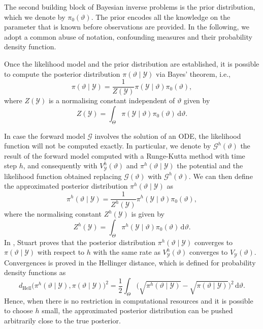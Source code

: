 \documentclass{siamart1116}
\numberwithin{theorem}{section}
\renewcommand{\theta}{\vartheta}
\newcommand{\Hell}{d_{\mathrm{Hell}}}
\newcommand{\dd}{\mathrm{d}}
\begin{document}
The second building block of Bayesian inverse problems is the prior distribution, which we denote by $\pi_0(\theta)$. The prior encodes all the knowledge on the parameter that is known before observations are provided. In the following, we adopt a common abuse of notation, confounding measures and their probability density function. 

Once the likelihood model and the prior distribution are established, it is possible to compute the posterior distribution $\pi(\theta \mid \mathcal{Y})$ via Bayes' theorem, i.e.,
\begin{equation}
	\pi(\theta\mid\mathcal{Y}) = \frac{1}{Z(\mathcal{Y})} \pi(\mathcal{Y}\mid \theta) \pi_0(\theta),
\end{equation}
where $Z(\mathcal{Y})$ is a normalising constant independent of $\theta$ given by
\begin{equation}
	Z(\mathcal{Y}) = \int_{\Theta} \pi(\mathcal{Y}\mid \theta)\pi_0(\theta) \, \dd \theta.
\end{equation} 

In case the forward model $\mathcal{G}$ involves the solution of an ODE, the likelihood function will not be computed exactly. In particular, we denote by $\mathcal{G}^h(\theta)$ the result of the forward model computed with a Runge-Kutta method with time step $h$, and consequently with $V^h_\mathcal{Y}(\theta)$ and $\pi^h(\theta\mid\mathcal{Y})$ the potential and the likelihood function obtained replacing $\mathcal{G}(\theta)$ with $\mathcal{G}^h(\theta)$. We can then define the approximated posterior distribution $\pi^h(\theta \mid \mathcal{Y})$ as
\begin{equation}
	\pi^h(\theta\mid\mathcal{Y}) = \frac{1}{Z^h(\mathcal{Y})} \pi^h(\mathcal{Y}\mid \theta) \pi_0(\theta) ,
\end{equation}
where the normalising constant $Z^h(\mathcal{Y})$ is given by
\begin{equation}
	Z^h(\mathcal{Y}) = \int_{\Theta} \pi^h(\mathcal{Y}\mid \theta)\pi_0(\theta)  \, \dd \theta.
\end{equation}
In \cite[Theorem 4.6]{Stu10}, Stuart proves that the posterior distribution $\pi^h(\theta\mid\mathcal{Y})$ converges to $\pi(\theta\mid\mathcal{Y})$ with respect to $h$ with the same rate as $V^h_\mathcal{Y}(\theta)$ converges to $V_\mathcal{Y}(\theta)$. Convergences is proved in the Hellinger distance, which is defined for probability density functions as
\begin{equation}
	\Hell\big(\pi^h(\theta\mid\mathcal{Y}), \pi(\theta\mid\mathcal{Y})\big)^2 = \frac{1}{2}\int_{\Theta} \Big(\sqrt{\pi^h(\theta\mid\mathcal{Y})} - \sqrt{\pi(\theta\mid\mathcal{Y})}\Big)^2 \, \dd \theta.
\end{equation}
Hence, when there is no restriction in computational resources and it is possible to choose $h$ small, the approximated posterior distribution can be pushed arbitrarily close to the true posterior.
\end{document}
